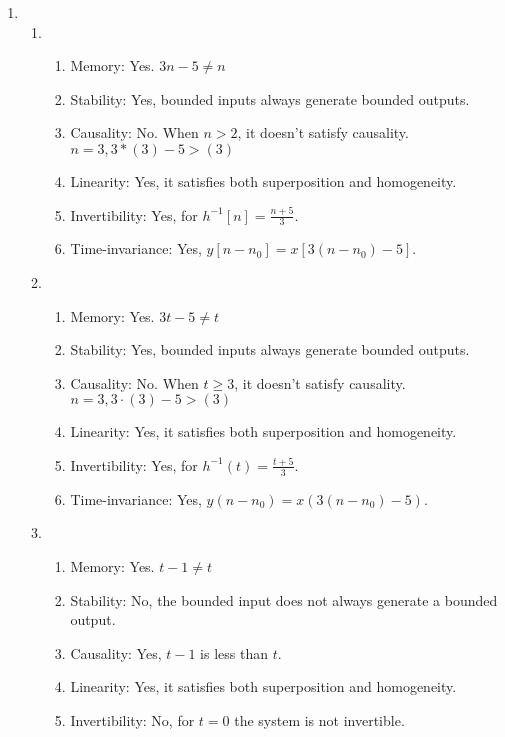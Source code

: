 \documentclass[10pt,a4paper, margin=1in]{article}
\begin{document}
\begin{enumerate}
\item %
    \begin{enumerate}
    \item 
        \begin{enumerate}
        \item Memory: Yes. $3n-5 \not = n $
        \item Stability: Yes, bounded inputs always generate bounded outputs.
        \item Causality: No. When $n>2$, it doesn't satisfy causality. $n=3, 3*(3) - 5 > (3)$
        \item Linearity: Yes, it satisfies both superposition and homogeneity.
        \item Invertibility: Yes, for $h^{-1}[n] = \frac{n + 5}{3}$.
        \item Time-invariance: Yes, $y[n - n_0] = x[3(n - n_0) - 5]$.
        \end{enumerate}
    \item
        \begin{enumerate}
        \item Memory: Yes. $3t-5 \not = t $
        \item Stability: Yes, bounded inputs always generate bounded outputs.
        \item Causality: No. When $t \geq 3$, it doesn't satisfy causality. $n=3, 3 \cdot (3) - 5 > (3)$
        \item Linearity: Yes, it satisfies both superposition and homogeneity.
        \item Invertibility: Yes, for $h^{-1}(t) = \frac{t + 5}{3}$.
        \item Time-invariance: Yes, $y(n - n_0) = x(3(n - n_0) - 5)$.
        \end{enumerate}
    \item 
        \begin{enumerate}
        \item Memory: Yes. $t-1 \not = t $
        \item Stability: No, the bounded input does not always generate a bounded output. 
        \item Causality: Yes, $t-1$ is less than $t$.
        \item Linearity: Yes, it satisfies both superposition and homogeneity.
        \item Invertibility: No, for $t = 0$ the system is not invertible.

\end{enumerate}
\end{enumerate}
\end{enumerate}
\end{document}
